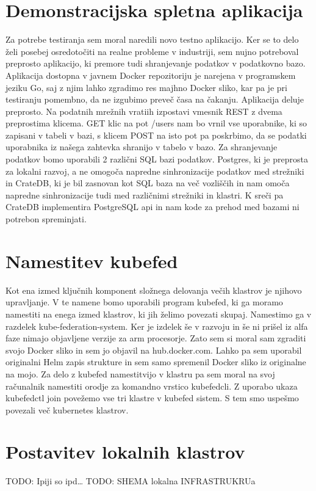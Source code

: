 \documentclass[a4paper, 12pt]{book}
\begin{document}
\section{Demonstracijska spletna aplikacija}
Za potrebe testiranja sem moral naredili novo testno aplikacijo.
Ker se to delo želi posebej osredotočiti na realne probleme v industriji, sem nujno potreboval preprosto aplikacijo, ki premore tudi shranjevanje podatkov v podatkovno bazo.
Aplikacija dostopna v javnem Docker repozitoriju je narejena v programskem jeziku Go, saj z njim lahko zgradimo res majhno Docker sliko, kar pa je pri testiranju pomembno, da ne izgubimo preveč časa na čakanju.
Aplikacija deluje preprosto.
Na podatnih mrežnih vratiih izpostavi vmesnik REST z dvema preprostima klicema.
GET klic na pot /users nam bo vrnil vse uporabnike, ki so zapisani v tabeli v bazi, s klicem POST na isto pot pa poskrbimo, da se podatki uporabnika iz našega zahtevka shranijo v tabelo v bazo.
Za shranjevanje podatkov bomo uporabili 2 različni SQL bazi podatkov.
Postgres, ki je preprosta za lokalni razvoj, a ne omogoča napredne sinhronizacije podatkov med strežniki in CrateDB, ki je bil zasnovan kot SQL baza na več vozliščih in nam omoča napredne sinhronizacije tudi med različnimi strežniki in klastri.
K sreči pa CrateDB implementira PostgreSQL api in nam kode za prehod med bazami ni potrebon spreminjati.
\section{Namestitev kubefed}
Kot ena izmed ključnih komponent složnega delovanja večih klastrov je njihovo upravljanje.
V te namene bomo uporabili program kubefed, ki ga moramo namestiti na enega izmed klastrov, ki jih želimo povezati skupaj.
Namestimo ga v razdelek kube-federation-system.
Ker je izdelek še v razvoju in še ni prišel iz alfa faze nimajo objavljene verzije za arm procesorje.
Zato sem si moral sam zgraditi svojo Docker sliko in sem jo objavil na hub.docker.com.
Lahko pa sem uporabil originalni Helm zapis strukture in sem samo spremenil Docker sliko iz originalne na mojo.
Za delo z kubefed namestitvijo v klastru pa sem moral na svoj računalnik namestiti orodje za komandno vrstico kubefedcli.
Z uporabo ukaza kubefedctl join povežemo vse tri klastre v kubefed sistem.
S tem smo uspešmo povezali več kubernetes klastrov.
\section{Postavitev lokalnih klastrov}
TODO: Ipiji so ipd\dots
TODO: SHEMA lokalna INFRASTRUKRUa
\end{document}
